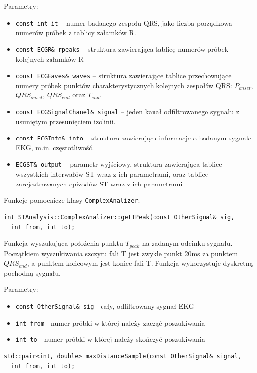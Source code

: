 \documentclass[a4paper, 11pt]{article}
\begin{document}
Parametry:
\begin{itemize}
  \item \verb|const int it| -- numer badanego zespołu QRS, jako liczba
    porządkowa numerów próbek z tablicy załamków R.
  \item \verb|const ECGR& rpeaks| -- struktura zawierająca tablicę numerów
    próbek kolejnych załamków R
  \item \verb|const ECGEaves& waves| -- struktura zawierające tablice
    przechowujące numery próbek punktów charakterystycznych kolejnych zespołów
    QRS: $P_{onset}$, $QRS_{onset}$, $QRS_{end}$ oraz $T_{end}$.
  \item \verb|const ECGSignalChanel& signal| -- jeden kanał odfiltrowanego
    sygnału z usuniętym przesunięciem izolinii.
  \item \verb|const ECGInfo& info| -- struktura zawierająca informacje o badanym
    sygnale EKG, m.in. częstotliwość.
  \item \verb|ECGST& output| -- parametr wyjściowy, struktura zawierająca
    tablice wszystkich interwałów ST wraz z ich parametrami, oraz tablice
    zarejestrowanych epizodów ST wraz z ich parametrami.
\end{itemize}

Funkcje pomocnicze klasy \verb|ComplexAnalizer|:

\begin{lstlisting}
int STAnalysis::ComplexAnalizer::getTPeak(const OtherSignal& sig,
  int from, int to);
\end{lstlisting}

Funkcja wyszukująca położenia punktu $T_{peak}$ na zadanym odcinku sygnału.
Początkiem wyszukiwania szczytu fali T jest zwykle punkt 20ms za punktem
$QRS_{end}$, a punktem końcowym jest koniec fali T. Funkcja wykorzystuje
dyskretną pochodną sygnału.

Parametry:
\begin{itemize}
  \item \verb|const OtherSignal& sig| - cały, odfiltrowany sygnał EKG
  \item \verb|int from| - numer próbki w której należy zacząć poszukiwania
  \item \verb|int to| - numer próbki w której należy skończyć poszukiwania
\end{itemize}


\begin{lstlisting}
std::pair<int, double> maxDistanceSample(const OtherSignal& signal, 
  int from, int to);
\end{lstlisting}
\end{document}
